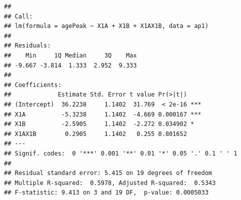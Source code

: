 \documentclass[
]{book}
\newenvironment{Shaded}{\begin{snugshade}}{\end{snugshade}}
\newcommand{\AttributeTok}[1]{\textcolor[rgb]{0.13,0.29,0.53}{#1}}
\newcommand{\DecValTok}[1]{\textcolor[rgb]{0.00,0.00,0.81}{#1}}
\newcommand{\DocumentationTok}[1]{\textcolor[rgb]{0.56,0.35,0.01}{\textbf{\textit{#1}}}}
\newcommand{\FunctionTok}[1]{\textcolor[rgb]{0.13,0.29,0.53}{\textbf{#1}}}
\newcommand{\NormalTok}[1]{#1}
\newcommand{\OtherTok}[1]{\textcolor[rgb]{0.56,0.35,0.01}{#1}}
\newcommand{\SpecialCharTok}[1]{\textcolor[rgb]{0.81,0.36,0.00}{\textbf{#1}}}
\newcommand{\StringTok}[1]{\textcolor[rgb]{0.31,0.60,0.02}{#1}}
\begin{document}
\begin{Shaded}
\end{Shaded}

\begin{verbatim}
## 
## Call:
## lm(formula = agePeak ~ X1A + X1B + X1AX1B, data = ap1)
## 
## Residuals:
##    Min     1Q Median     3Q    Max 
## -9.667 -3.814  1.333  2.952  9.333 
## 
## Coefficients:
##             Estimate Std. Error t value Pr(>|t|)    
## (Intercept)  36.2238     1.1402  31.769  < 2e-16 ***
## X1A          -5.3238     1.1402  -4.669 0.000167 ***
## X1B          -2.5905     1.1402  -2.272 0.034902 *  
## X1AX1B        0.2905     1.1402   0.255 0.801652    
## ---
## Signif. codes:  0 '***' 0.001 '**' 0.01 '*' 0.05 '.' 0.1 ' ' 1
## 
## Residual standard error: 5.415 on 19 degrees of freedom
## Multiple R-squared:  0.5978, Adjusted R-squared:  0.5343 
## F-statistic: 9.413 on 3 and 19 DF,  p-value: 0.0005033
\end{verbatim}
\end{document}
